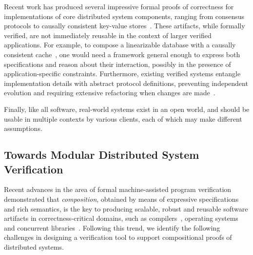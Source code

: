Recent work has produced several impressive formal proofs of
correctness for implementations of core distributed system components,
ranging from consensus protocols to causally consistent key-value
stores~\cite{Newcombe-al:CACM14,Woos-al:CPP16,Hawblitzel-al:SOSP15,Lesani-al:POPL16}.
%
These artifacts, while formally verified, are not immediately reusable
in the context of larger verified applications.
%
For example, to compose a linearizable database with a causally
consistent cache~\cite{Ahamad-al:DC95}, one would need a framework
general enough to express both specifications and reason about their
interaction, possibly in the presence of application-specific
constraints.
%
Furthermore, existing verified systems entangle implementation details
with abstract protocol definitions, preventing independent evolution
and requiring extensive refactoring when changes are
made~\cite{Woos-al:CPP16}.

Finally, like all software, real-world systems exist in an open world,
and should be usable in multiple contexts by various clients, each of
which may make different assumptions.


\subsection{Towards Modular Distributed System Verification}
\label{sec:towards-comp-verif}

Recent advances in the area of formal machine-assisted program
verification demonstrated that \emph{composition}, obtained by means
of expressive specifications and rich semantics, is the key to
producing scalable, robust and reusable software artifacts in
correctness-critical domains, such as
compilers~\cite{Stewart-al:POPL15,Kumar-al:POPL14}, operating
systems~\cite{Gu-al:POPL15,sel4:CACM10} and concurrent
libraries~\cite{Sergey-al:PLDI15,Gu-al:OSDI16}.
%
%
Following this trend, we identify the following challenges in
designing a verification tool to support compositional proofs of
distributed systems.


